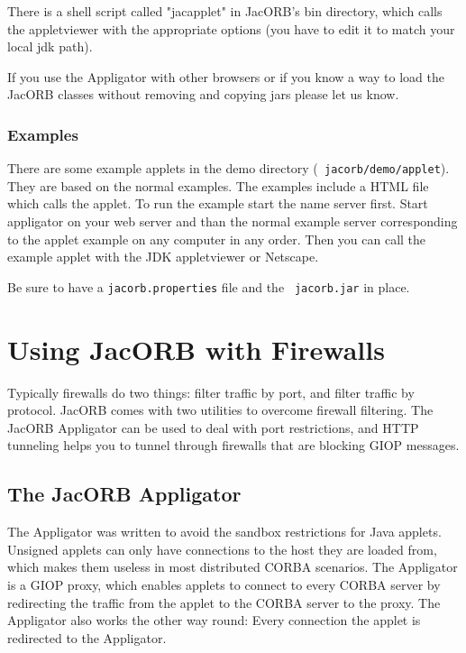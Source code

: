 \documentclass[12pt]{scrbook}
\begin{document}

There is a shell script  called "jacapplet" in JacORB's bin directory,
which calls the appletviewer with the appropriate options (you have to
edit it to match your local jdk path).

If you use the Appligator with other  browsers or if you know a way to
load the JacORB  classes without removing and copying  jars please let
us know.

\subsubsection*{Examples}

There  are   some  example  applets   in  the  demo   directory  ({\tt
jacorb/demo/applet}).   They are  based on  the normal  examples.  The
examples  include a  HTML file  which calls  the applet.   To  run the
example  start the  name server  first. Start  appligator on  your web
server and than the normal  example server corresponding to the applet
example on any  computer in any order.  Then you  can call the example
applet with the JDK appletviewer or Netscape.

Be  sure  to  have  a   {\tt  jacorb.properties}  file  and  the  {\tt
jacorb.jar} in place.


\section{Using JacORB with Firewalls}

Typically firewalls do two things:  filter traffic by port, and filter
traffic  by protocol.   JacORB comes  with two  utilities  to overcome
firewall filtering.   The JacORB Appligator  can be used to  deal with
port  restrictions, and  HTTP tunneling  helps you  to  tunnel through
firewalls that are blocking GIOP messages.


\subsection{The JacORB Appligator}

The Appligator was written to  avoid the sandbox restrictions for Java
applets. Unsigned applets  can only have connections to  the host they
are loaded  from, which makes  them useless in most  distributed CORBA
scenarios. The  Appligator is a  GIOP proxy, which enables  applets to
connect  to every  CORBA server  by redirecting  the traffic  from the
applet to the CORBA server to the proxy. The Appligator also works the
other  way round:  Every connection  the applet  is redirected  to the
Appligator.
\end{document}
